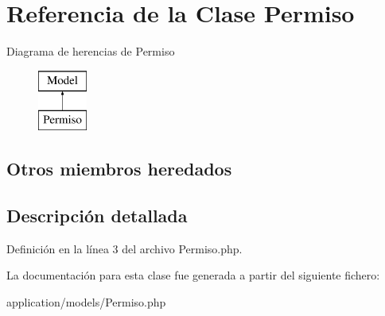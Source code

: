\hypertarget{class_permiso}{}\section{Referencia de la Clase Permiso}
\label{class_permiso}
Diagrama de herencias de Permiso\begin{figure}[H]
\begin{center}
\leavevmode
\includegraphics[height=2.000000cm]{class_permiso}
\end{center}
\end{figure}
\subsection*{Otros miembros heredados}


\subsection{Descripción detallada}


Definición en la línea 3 del archivo Permiso.\+php.



La documentación para esta clase fue generada a partir del siguiente fichero\+:\begin{DoxyCompactItemize}
\item 
application/models/Permiso.\+php\end{DoxyCompactItemize}
